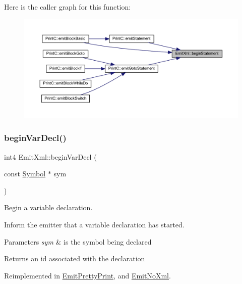 Here is the caller graph for this function\+:
\nopagebreak
\begin{figure}[H]
\begin{center}
\leavevmode
\includegraphics[width=350pt]{class_emit_xml_a597d30a7231fa323c2bdef9afc8160aa_icgraph}
\end{center}
\end{figure}
\mbox{\label{class_emit_xml_a039212bc4a27cf56f1c70acd4d4623b6}} 
\subsubsection{\texorpdfstring{beginVarDecl()}{beginVarDecl()}}
{\footnotesize\ttfamily int4 Emit\+Xml\+::begin\+Var\+Decl (\begin{DoxyParamCaption}\item[{const \mbox{\hyperlink{class_symbol}{Symbol}} $\ast$}]{sym }\end{DoxyParamCaption})\hspace{0.3cm}{\ttfamily [virtual]}}



Begin a variable declaration. 

Inform the emitter that a variable declaration has started. 
\begin{DoxyParams}{Parameters}
{\em sym} & is the symbol being declared \\
\hline
\end{DoxyParams}
\begin{DoxyReturn}{Returns}
an id associated with the declaration 
\end{DoxyReturn}


Reimplemented in \mbox{\hyperlink{class_emit_pretty_print_a9df518db8bdc76a0327a05cc26701459}{Emit\+Pretty\+Print}}, and \mbox{\hyperlink{class_emit_no_xml_a5d3a356f62dc06efc46b35fc969323ae}{Emit\+No\+Xml}}.



